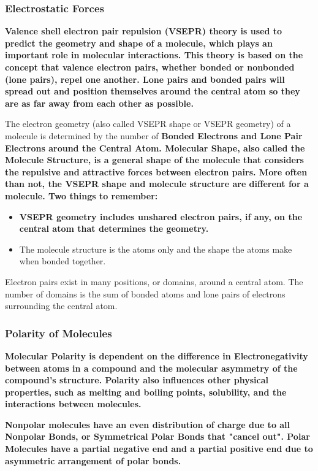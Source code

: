 
\subsubsection*{Electrostatic Forces}

\bf{Valence shell electron pair repulsion (VSEPR)} theory is used to predict the geometry and shape of a molecule, which plays an important role in molecular interactions. This theory is based on the concept that valence electron pairs, whether bonded or nonbonded (lone pairs), repel one another. Lone pairs and bonded pairs will spread out and position themselves around the central atom so they are as far away from each other as possible.

The electron geometry (also called VSEPR shape or VSEPR geometry) of a molecule is determined by the number of \bf{Bonded Electrons} and \bf{Lone Pair Electrons} around the \bf{Central Atom}. \bf{Molecular Shape}, also called the \bf{Molecule Structure}, is a general shape of the molecule that considers the repulsive and attractive forces between electron pairs. More often than not, the \bf{VSEPR} shape and molecule structure are different for a molecule. Two things to remember:

\begin{itemize}
    \item \bf{VSEPR} geometry includes unshared electron pairs, if any, on the central atom that determines the geometry.
    \item The molecule structure is the atoms only and the shape the atoms make when bonded together.
\end{itemize}

Electron pairs exist in many positions, or domains, around a central atom. The number of domains is the sum of bonded atoms and lone pairs of electrons surrounding the central atom.

\subsubsection*{Polarity of Molecules}

\bf{Molecular Polarity} is dependent on the difference in \bf{Electronegativity} between atoms in a compound and the molecular asymmetry of the compound's structure. Polarity also influences other physical properties, such as melting and boiling points, solubility, and the interactions between molecules.

\bf{Nonpolar} molecules have an even distribution of charge due to all \bf{Nonpolar Bonds}, or \bf{Symmetrical Polar Bonds} that "cancel out". \bf{Polar Molecules} have a partial negative end and a partial positive end due to asymmetric arrangement of polar bonds.

\newpage
